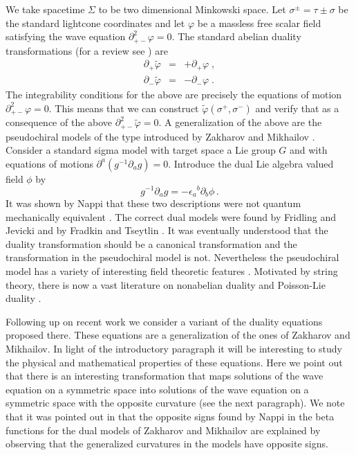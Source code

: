\documentclass[a4paper,12pt]{article}
\newcommand{\dalem}{\partial^{2}_{+-}}
\newcommand{\dminus}{\partial_{-}}
\newcommand{\dplus}{\partial_{+}}
\begin{document}
We take spacetime $\Sigma$ to be two dimensional Minkowski space.  Let
$\sigma^{\pm} = \tau\pm\sigma$ be the standard lightcone coordinates
and let $\varphi$ be a massless free scalar field satisfying the wave
equation $\dalem\varphi=0$.  The standard abelian duality
transformations (for a review see \cite{Giveon:1994fu}) are
\begin{eqnarray}
    \dplus\tilde{\varphi} & = & +\dplus\varphi\;,
    \label{eq:olddualp}  \\
     \dminus\tilde{\varphi} & = & -\dminus\varphi\;.
    \label{eq:olddualm}
\end{eqnarray}
The integrability conditions for the above are precisely the equations
of motion $\dalem\varphi=0$.  This means that we can construct
$\tilde{\varphi}(\sigma^{+},\sigma^{-})$ and verify that as a
consequence of the above $\dalem\tilde{\varphi}=0$.  A generalization
of the above are the pseudochiral models of the type introduced by
Zakharov and Mikhailov \cite{Zakharov:1978pp}.  
Consider a standard sigma model with target space a Lie group $G$
and with equations of motions $\partial^{a}(g^{-1}\partial_{a}g)=0$. 
Introduce the dual Lie algebra valued field $\phi$ by
$$
    g^{-1}\partial_{a}g = -\epsilon_{a}{}^{b}\partial_{b}\phi\,.
$$
It was shown by Nappi that these two descriptions were not quantum
mechanically equivalent \cite{Nappi:1980ig}.  The correct dual models
were found by Fridling and Jevicki \cite{Fridling:1984ha} and by
Fradkin and Tseytlin \cite{Fradkin:1985ai}.  It was eventually
understood that the duality transformation should be a canonical
transformation \cite{Curtright:1994be,Alvarez:1994wj} and the
transformation in the pseudochiral model is not.  Nevertheless the
pseudochiral model has a variety of interesting field theoretic
features \cite{Curtright:1994be,Zachos:1994fa}.  Motivated by string
theory, there is now a vast literature on nonabelian duality
\cite{Kiritsis:1991zt,Rocek:1992ps,Giveon:1992jj,delaOssa:1993vc,%
Gasperini:1993nz,Giveon:1994mw,Giveon:1994ai,Giveon:1994ph,%
Alvarez:1994zr,Alvarez:1994qi,Lozano:1995jx,Lozano:1996sc,%
Alvarez:1995uc}
and Poisson-Lie duality
\cite{Klimcik:1995ux,Klimcik:1996dy,Klimcik:1996kw,%
Sfetsos:1998pi,Sfetsos:1996xj,Stern:1998my}.

Following up on recent work \cite{Alvarez:2000bh} we consider a
variant of the duality equations proposed there.  These equations are
a generalization of the ones of Zakharov and Mikhailov.  In light of
the introductory paragraph it will be interesting to study the
physical and mathematical properties of these equations.  Here we
point out that there is an interesting transformation that maps
solutions of the wave equation on a symmetric space into solutions of
the wave equation on a symmetric space with the opposite curvature 
(see the next paragraph). 
We note that it was pointed out in \cite{Zachos:1994fa} that the
opposite signs found by Nappi in the beta functions for the dual
models of Zakharov and Mikhailov are explained by observing that the
generalized curvatures in the models have opposite signs.
\end{document}
